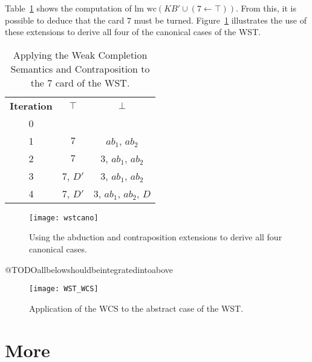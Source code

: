 Table~\ref{tbl:7cont} shows the computation of $\textrm{lm wc} (KB'\cup (7\leftarrow\top))$. From this, it is possible to deduce that the card $7$ must be turned. Figure~\ref{fig:wstcano} illustrates the use of these extensions to derive all four of the canonical cases of the WST.


\begin{table}
\begin{center}

\begin{tabular}{ c c c }
 \textbf{Iteration} & \textbf{$\top$} & \textbf{$\bot$} \\ 
 0 &  &  \\  
 1 &  $7$ & $ab_1$, $ab_2$  \\  
 2 &  $7$ & $3$, $ab_1$, $ab_2$  \\
 3 &  $7$, $D'$ & $3$, $ab_1$, $ab_2$  \\
 4 &  $7$, $D'$ & $3$, $ab_1$, $ab_2$, $D$  
\end{tabular}
\caption{Applying the Weak Completion Semantics and Contraposition to the $7$ card of the WST.}
\label{tbl:7cont}

\end{center}
\end{table}

\begin{figure}
\centering \texttt{[image: wstcano]}
\caption{Using the abduction and contraposition extensions to derive all four canonical cases.}
\label{fig:wstcano}
\end{figure}

@TODOallbelowshouldbeintegratedintoabove

\begin{figure}
\centering \texttt{[image: WST\_WCS]}
\caption{Application of the WCS to the abstract case of the WST.}
\label{wst_wcs}
\end{figure}






\section{More}